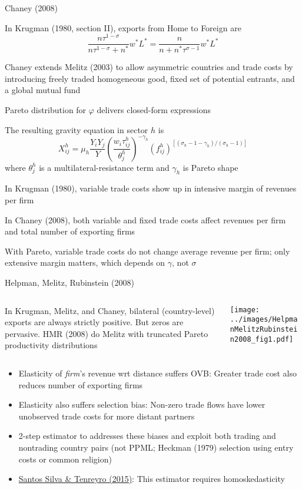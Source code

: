 \documentclass[10pt,notes=hide]{beamer}
\begin{document}
\begin{frame}{Chaney (2008)}
\begin{itemize}
{\small
	\item In Krugman (1980, section II), exports from Home to Foreign are
	$$
	\frac{n \tau^{1-\sigma}}{n \tau^{1-\sigma} + n^*} w^*L^*
	=
	\frac{n}{n+n^* \tau^{\sigma-1}} w^*L^*
	$$
	\item Chaney extends Melitz (2003) to allow asymmetric countries and trade costs by introducing freely traded homogeneous good, fixed set of potential entrants, and a global mutual fund
	\item Pareto distribution for $\varphi$ delivers closed-form expressions
	\item The resulting gravity equation in sector $h$ is
	$$
	X_{ij}^{h}= \mu_h \frac{Y_i Y_j}{Y}
	\left(\frac{w_i \tau_{ij}^h}{\theta_j^h}\right)^{-\gamma_h}
	\left(f_{ij}^{h}\right)^{[(\sigma_h-1-\gamma_h)/(\sigma_h-1)]}
	$$
	where $\theta_j^h$ is a multilateral-resistance term and $\gamma_h$ is Pareto shape 
	\item In Krugman (1980), variable trade costs show up in intensive margin of revenues per firm
	\item In Chaney (2008), both variable and fixed trade costs affect revenues per firm and total number of exporting firms
	\item With Pareto, variable trade costs do not change average revenue per firm; only extensive margin matters, which depends on $\gamma$, not $\sigma$
}
\end{itemize}
\end{frame}
\begin{frame}{Helpman, Melitz, Rubinstein (2008)}
\begin{columns}
\begin{column}{.4\textwidth}
In Krugman, Melitz, and Chaney, bilateral (country-level) exports are always strictly positive. But zeros are pervasive.
HMR (2008) do Melitz with truncated Pareto productivity distributions 
\end{column}
\begin{column}{.6\textwidth}
\texttt{[image: ../images/HelpmanMelitzRubinstein2008\_fig1.pdf]}
\end{column}
\end{columns}
\begin{itemize}
	\item Elasticity of \textit{firm}'s revenue wrt distance suffers OVB: 
	Greater trade cost also reduces number of exporting firms
	\item Elasticity also suffers selection bias: 
	Non-zero trade flows have lower unobserved trade costs for more distant partners
	\item 2-step estimator to addresses these biases and exploit both trading and nontrading country pairs (not PPML; Heckman (1979) selection using entry costs or common religion)
  \item {\footnotesize \href{https://onlinelibrary.wiley.com/doi/full/10.1111/obes.12055}{Santos Silva \& Tenreyro (2015)}:
  This estimator requires homoskedasticity}
\end{itemize}
\end{frame}
\end{document}

